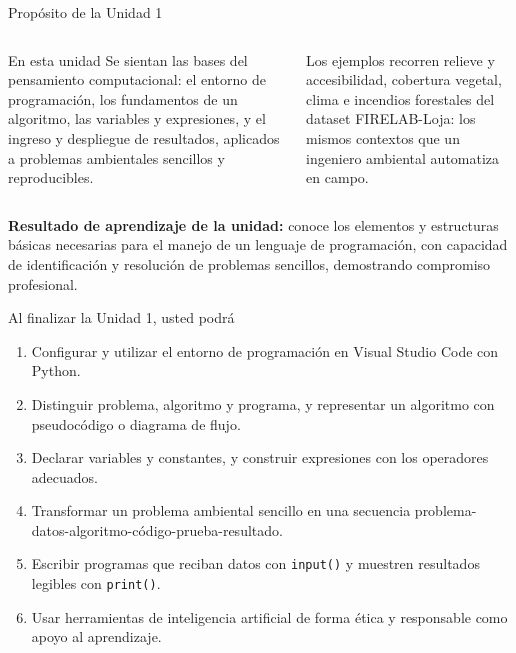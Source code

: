 \documentclass[aspectratio=169,11pt]{beamer}
\begin{document}
\begin{frame}{Propósito de la Unidad 1}
\small
\begin{columns}[T,onlytextwidth]
\begin{block}{En esta unidad}
Se sientan las bases del pensamiento computacional: el entorno de programación, los fundamentos de un algoritmo, las variables y expresiones, y el ingreso y despliegue de resultados, aplicados a problemas ambientales sencillos y reproducibles.
\end{block}
\begin{envbox}
Los ejemplos recorren relieve y accesibilidad, cobertura vegetal, clima e incendios forestales del dataset FIRELAB-Loja: los mismos contextos que un ingeniero ambiental automatiza en campo.
\end{envbox}
\end{columns}
\vspace{0.02cm}
\begin{keybox}[top=2pt,bottom=2pt]
\footnotesize\textbf{Resultado de aprendizaje de la unidad:} conoce los elementos y estructuras básicas necesarias para el manejo de un lenguaje de programación, con capacidad de identificación y resolución de problemas sencillos, demostrando compromiso profesional.
\end{keybox}
\end{frame}

\begin{frame}{Al finalizar la Unidad 1, usted podrá}
\small
\begin{enumerate}
  \item Configurar y utilizar el entorno de programación en Visual Studio Code con Python.
  \item Distinguir problema, algoritmo y programa, y representar un algoritmo con pseudocódigo o diagrama de flujo.
  \item Declarar variables y constantes, y construir expresiones con los operadores adecuados.
  \item Transformar un problema ambiental sencillo en una secuencia problema-datos-algoritmo-código-prueba-resultado.
  \item Escribir programas que reciban datos con \texttt{input()} y muestren resultados legibles con \texttt{print()}.
  \item Usar herramientas de inteligencia artificial de forma ética y responsable como apoyo al aprendizaje.
\end{enumerate}
\end{frame}
\end{document}
